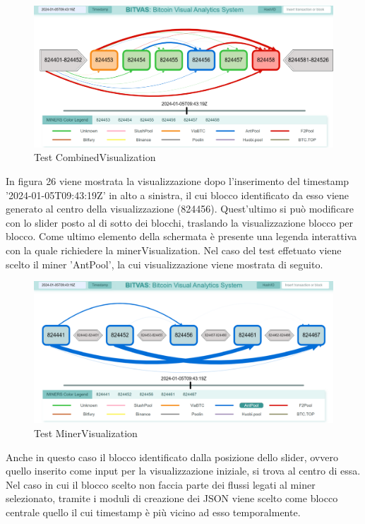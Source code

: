 \begin{figure}[H]
    \centering \includegraphics[keepaspectratio=true,scale=0.3]{Images/CombinedVisTested.png}
    \caption{Test CombinedVisualization}
\end{figure}

In figura 26 viene mostrata la visualizzazione dopo l'inserimento del timestamp '2024-01-05T09:43:19Z' in alto a sinistra, il cui blocco identificato da esso viene generato al centro della visualizzazione (824456).
Quest'ultimo si può modificare con lo slider posto al di sotto dei blocchi, traslando la visualizzazione blocco per blocco. 
Come ultimo elemento della schermata è presente una legenda interattiva con la quale richiedere la minerVisualization.
Nel caso del test effetuato viene scelto il miner 'AntPool', la cui visualizzazione viene mostrata di seguito.

\begin{figure}[H]
        \centering \includegraphics[keepaspectratio=true,scale=0.28]{Images/MinerVisualizationTest.png}
    \caption{Test MinerVisualization}
\end{figure}
\thispagestyle{mystyle}
Anche in questo caso il blocco identificato dalla posizione dello slider, ovvero quello inserito come input per la visualizzazione iniziale, si trova al centro di essa.
Nel caso in cui il blocco scelto non faccia parte dei flussi legati al miner selezionato, tramite i moduli di creazione dei JSON viene scelto come blocco centrale quello il cui timestamp è più vicino ad esso temporalmente.

\thispagestyle{mystyle}

